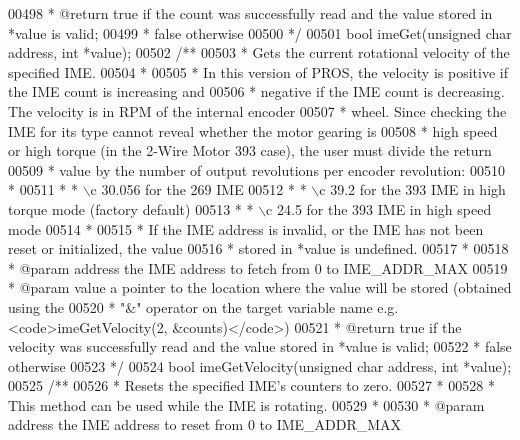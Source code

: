 \begin{DoxyCode}
00498 \textcolor{comment}{ * @return true if the count was successfully read and the value stored in *value is valid;}
00499 \textcolor{comment}{ * false otherwise}
00500 \textcolor{comment}{ */}
00501 \textcolor{keywordtype}{bool} imeGet(\textcolor{keywordtype}{unsigned} \textcolor{keywordtype}{char} address, \textcolor{keywordtype}{int} *value);
00502 \textcolor{comment}{/**}
00503 \textcolor{comment}{ * Gets the current rotational velocity of the specified IME.}
00504 \textcolor{comment}{ *}
00505 \textcolor{comment}{ * In this version of PROS, the velocity is positive if the IME count is increasing and}
00506 \textcolor{comment}{ * negative if the IME count is decreasing. The velocity is in RPM of the internal encoder}
00507 \textcolor{comment}{ * wheel. Since checking the IME for its type cannot reveal whether the motor gearing is}
00508 \textcolor{comment}{ * high speed or high torque (in the 2-Wire Motor 393 case), the user must divide the return}
00509 \textcolor{comment}{ * value by the number of output revolutions per encoder revolution:}
00510 \textcolor{comment}{ *}
00511 \textcolor{comment}{ * * \(\backslash\)c 30.056 for the 269 IME}
00512 \textcolor{comment}{ * * \(\backslash\)c 39.2 for the 393 IME in high torque mode (factory default)}
00513 \textcolor{comment}{ * * \(\backslash\)c 24.5 for the 393 IME in high speed mode}
00514 \textcolor{comment}{ *}
00515 \textcolor{comment}{ * If the IME address is invalid, or the IME has not been reset or initialized, the value}
00516 \textcolor{comment}{ * stored in *value is undefined.}
00517 \textcolor{comment}{ *}
00518 \textcolor{comment}{ * @param address the IME address to fetch from 0 to IME\_ADDR\_MAX}
00519 \textcolor{comment}{ * @param value a pointer to the location where the value will be stored (obtained using the}
00520 \textcolor{comment}{ * "&" operator on the target variable name e.g. <code>imeGetVelocity(2, &counts)</code>)}
00521 \textcolor{comment}{ * @return true if the velocity was successfully read and the value stored in *value is valid;}
00522 \textcolor{comment}{ * false otherwise}
00523 \textcolor{comment}{ */}
00524 \textcolor{keywordtype}{bool} imeGetVelocity(\textcolor{keywordtype}{unsigned} \textcolor{keywordtype}{char} address, \textcolor{keywordtype}{int} *value);
00525 \textcolor{comment}{/**}
00526 \textcolor{comment}{ * Resets the specified IME's counters to zero.}
00527 \textcolor{comment}{ *}
00528 \textcolor{comment}{ * This method can be used while the IME is rotating.}
00529 \textcolor{comment}{ *}
00530 \textcolor{comment}{ * @param address the IME address to reset from 0 to IME\_ADDR\_MAX}

\end{DoxyCode}
